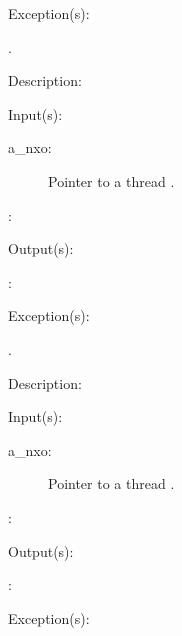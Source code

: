 \begin{capi}
\begin{capilist}
	\item[Exception(s): ]
		\begin{description}\item[]
		\item[.]
		\end{description}
	\item[Description: ]
	\end{capilist}
\label{nxo_thread_}
	\begin{capilist}
	\item[Input(s): ]
		\begin{description}\item[]
		\item[a\_nxo: ]
			Pointer to a thread .
		\item[: ]
		\end{description}
	\item[Output(s): ]
		\begin{description}\item[]
		\item[: ]
		\end{description}
	\item[Exception(s): ]
		\begin{description}\item[]
		\item[.]
		\end{description}
	\item[Description: ]
	\end{capilist}
\label{nxo_thread_}
	\begin{capilist}
	\item[Input(s): ]
		\begin{description}\item[]
		\item[a\_nxo: ]
			Pointer to a thread \classname{nxo}.
		\item[: ]
		\end{description}
	\item[Output(s): ]
		\begin{description}\item[]
		\item[: ]
		\end{description}
	\item[Exception(s): ]
		\begin{description}\item[]

\end{description}
\end{capilist}
\end{capi}
